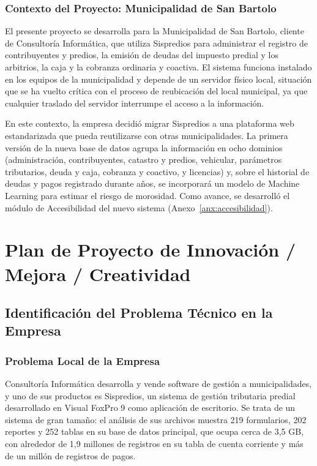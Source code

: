 \documentclass[12pt,a4paper]{report}
\begin{document}
\subsection{Contexto del Proyecto: Municipalidad de San Bartolo}
El presente proyecto se desarrolla para la Municipalidad de San Bartolo, cliente de Consultoría Informática, que utiliza Sispredios para administrar el registro de contribuyentes y predios, la emisión de deudas del impuesto predial y los arbitrios, la caja y la cobranza ordinaria y coactiva. El sistema funciona instalado en los equipos de la municipalidad y depende de un servidor físico local, situación que se ha vuelto crítica con el proceso de reubicación del local municipal, ya que cualquier traslado del servidor interrumpe el acceso a la información.

En este contexto, la empresa decidió migrar Sispredios a una plataforma web estandarizada que pueda reutilizarse con otras municipalidades. La primera versión de la nueva base de datos agrupa la información en ocho dominios (administración, contribuyentes, catastro y predios, vehicular, parámetros tributarios, deuda y caja, cobranza y coactivo, y licencias) y, sobre el historial de deudas y pagos registrado durante años, se incorporará un modelo de Machine Learning para estimar el riesgo de morosidad. Como avance, se desarrolló el módulo de Accesibilidad del nuevo sistema (Anexo~\ref{anx:accesibilidad}).

\chapter{Plan de Proyecto de Innovación / Mejora / Creatividad}

\section{Identificación del Problema Técnico en la Empresa}

\subsection{Problema Local de la Empresa}

Consultoría Informática desarrolla y vende software de gestión a municipalidades, y uno de sus productos es Sispredios, un sistema de gestión tributaria predial desarrollado en Visual FoxPro 9 como aplicación de escritorio. Se trata de un sistema de gran tamaño: el análisis de sus archivos muestra 219 formularios, 202 reportes y 252 tablas en su base de datos principal, que ocupa cerca de 3,5 GB, con alrededor de 1,9 millones de registros en su tabla de cuenta corriente y más de un millón de registros de pagos. %
\end{document}
